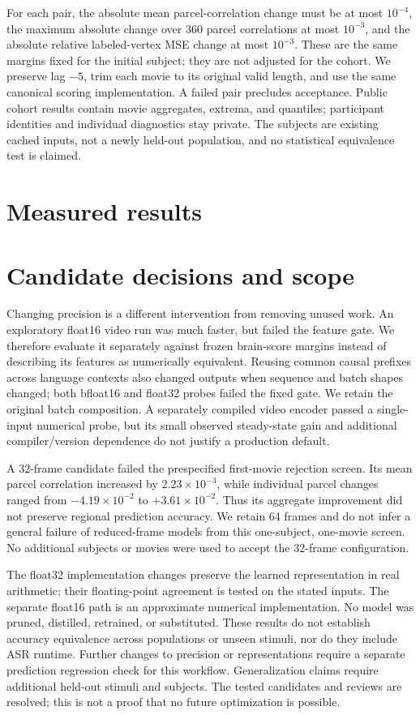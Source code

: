 \documentclass[10pt]{article}
\begin{document}
For each pair, the absolute mean parcel-correlation change must be at most
$10^{-4}$, the maximum absolute change over 360 parcel correlations at most
$10^{-3}$, and the absolute relative labeled-vertex MSE change at most $10^{-3}$.
These are the same margins fixed for the initial subject; they are not adjusted
for the cohort. We preserve lag $-5$, trim each movie to its original valid
length, and use the same canonical scoring implementation. A failed pair
precludes acceptance. Public cohort results contain movie aggregates, extrema,
and quantiles; participant identities and individual diagnostics stay private.
The subjects are existing cached inputs, not a newly held-out population, and
no statistical equivalence test is claimed.

\section{Measured results}


\section{Candidate decisions and scope}
Changing precision is a different intervention from removing unused work.
An exploratory float16 video run was much faster, but failed the feature gate.
We therefore evaluate it separately against frozen brain-score margins instead
of describing its features as numerically equivalent. Reusing common causal prefixes
across language contexts also changed outputs when sequence and batch shapes
changed; both bfloat16 and float32 probes failed the fixed gate. We retain the
original batch composition. A separately compiled video encoder passed a
single-input numerical probe, but its small observed steady-state gain and
additional compiler/version dependence do not justify a production default.

A 32-frame candidate failed the prespecified first-movie rejection screen.
Its mean parcel correlation increased by $2.23\times10^{-3}$, while individual
parcel changes ranged from $-4.19\times10^{-2}$ to $+3.61\times10^{-2}$.
Thus its aggregate improvement did not preserve regional prediction accuracy.
We retain 64 frames and do not infer a general failure of reduced-frame models
from this one-subject, one-movie screen. No additional subjects or movies were
used to accept the 32-frame configuration.

The float32 implementation changes preserve the learned representation in real
arithmetic; their floating-point agreement is tested on the stated inputs.
The separate float16 path is an approximate numerical implementation. No model was
pruned, distilled, retrained, or substituted. These results do not establish
accuracy equivalence across populations or unseen stimuli, nor do they include
ASR runtime. Further changes to precision or representations require a separate prediction
regression check for this workflow. Generalization claims require additional
held-out stimuli and subjects. The tested candidates and reviews are
resolved; this is not a proof that no future optimization is possible.
\end{document}
